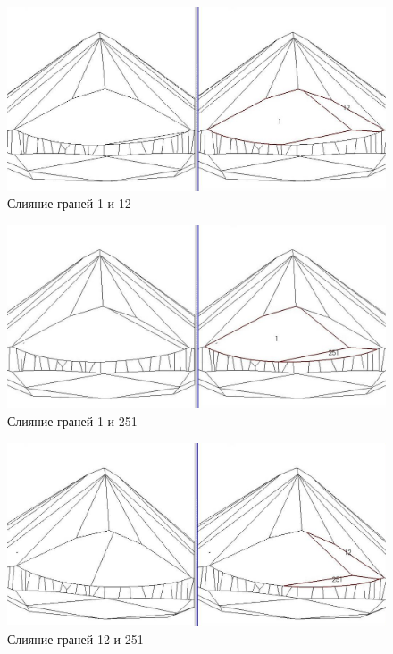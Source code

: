 \documentclass[a4paper,12pt, titlepage]{article}
\begin{document}
\begin{flushleft}
  \begin{figure}[p]
    \includegraphics[width=15cm]{polyhedron-2010-11-25/join10.jpeg}
    \caption{Слияние граней 1 и 12}\label{join10}
  \end{figure}
\end{flushleft}
\begin{flushleft}
  \begin{figure}[p]
    \includegraphics[width=15cm]{polyhedron-2010-11-25/join11.jpeg}
    \caption{Слияние граней 1 и 251}\label{join11}
  \end{figure}
\end{flushleft}
\begin{flushleft}
  \begin{figure}[p]
    \includegraphics[width=15cm]{polyhedron-2010-11-25/join12.jpeg}
    \caption{Слияние граней 12 и 251}\label{join12}
  \end{figure}
\end{flushleft}
\end{document}
